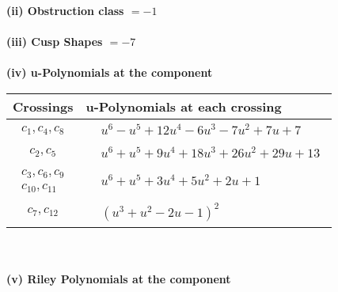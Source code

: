 \documentclass[1p]{elsarticle_modified}
\theoremstyle{definition}
\begin{document}
\flushleft \textbf{(ii) Obstruction class $= -1$}\\~\\
\flushleft \textbf{(iii) Cusp Shapes $= -7$}\\~\\
\newpage\renewcommand{\arraystretch}{1}
\flushleft \textbf{(iv) u-Polynomials at the component}\newline \\
\begin{tabular}{m{50pt}|m{274pt}}
Crossings & \hspace{64pt}u-Polynomials at each crossing \\
\hline $$\begin{aligned}c_{1},c_{4},c_{8}\end{aligned}$$&$\begin{aligned}
&u^6- u^5+12 u^4-6 u^3-7 u^2+7 u+7
\end{aligned}$\\
\hline $$\begin{aligned}c_{2},c_{5}\end{aligned}$$&$\begin{aligned}
&u^6+u^5+9 u^4+18 u^3+26 u^2+29 u+13
\end{aligned}$\\
\hline $$\begin{aligned}c_{3},c_{6},c_{9}\\c_{10},c_{11}\end{aligned}$$&$\begin{aligned}
&u^6+u^5+3 u^4+5 u^2+2 u+1
\end{aligned}$\\
\hline $$\begin{aligned}c_{7},c_{12}\end{aligned}$$&$\begin{aligned}
&(u^3+u^2-2 u-1)^2
\end{aligned}$\\
\hline
\end{tabular}\\~\\
\newpage\renewcommand{\arraystretch}{1}
\flushleft \textbf{(v) Riley Polynomials at the component}\newline \\
\end{document}
